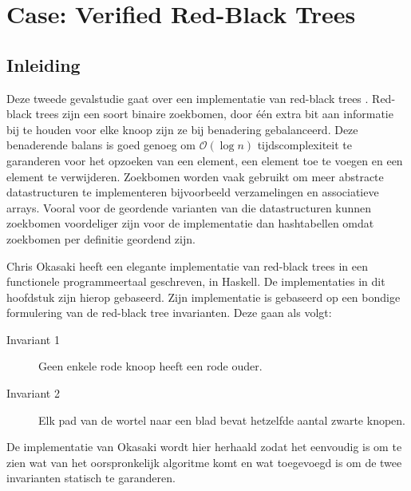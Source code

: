 \chapter{Case: Verified Red-Black Trees}
\label{case:rbtree}


\section{Inleiding}

Deze tweede gevalstudie gaat over een implementatie van red-black trees
\cite{rbtrees}. Red-black trees zijn een soort binaire zoekbomen, door één
extra bit aan informatie bij te houden voor elke knoop zijn ze bij benadering
gebalanceerd. Deze benaderende balans is goed genoeg om $\mathcal{O}(\log{}n)$
tijdscomplexiteit te garanderen voor het opzoeken van een element, een element
toe te voegen en een element te verwijderen. Zoekbomen worden vaak gebruikt om
meer abstracte datastructuren te implementeren bijvoorbeeld verzamelingen en
associatieve arrays. Vooral voor de geordende varianten van die datastructuren
kunnen zoekbomen voordeliger zijn voor de implementatie dan hashtabellen omdat
zoekbomen per definitie geordend zijn.

Chris Okasaki heeft een elegante implementatie van red-black trees
\cite{okasaki} in een functionele programmeertaal geschreven, in Haskell.
De implementaties in dit hoofdstuk zijn hierop gebaseerd.
Zijn implementatie is gebaseerd op een bondige formulering van de red-black
tree invarianten. Deze gaan als volgt:

\begin{description}
  \item[Invariant 1] Geen enkele rode knoop heeft een rode ouder.
  \item[Invariant 2] Elk pad van de wortel naar een blad bevat hetzelfde aantal
                     zwarte knopen.
\end{description}

De implementatie van Okasaki wordt hier herhaald zodat het eenvoudig is om te
zien wat van het oorspronkelijk algoritme komt en wat toegevoegd is om de twee
invarianten statisch te garanderen.


